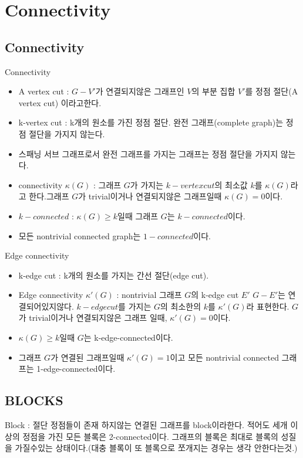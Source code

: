 \section{Connectivity}

\subsection{Connectivity}

\begin{dfn}[Connectivity] 
    Connectivity
    \begin{itemize}
        \item A vertex cut : $G-V'$가 연결되지않은 그래프인 $V$의 부분 집합 $V'$를 정점 절단(A vertex cut) 이라고한다.
        \item k-vertex cut : k개의 원소를 가진 정점 절단. 완전 그래프(complete graph)는 정점 절단을 가지지 않는다.
        \item 스패닝 서브 그래프로서 완전 그래프를 가지는 그래프는 정점 절단을 가지지 않는다.
        \item  connectivity $\kappa(G)$ : 그래프 $G$가 가지는 $k-vertex cut$의 최소값 $k$를 $\kappa(G)$라고 한다.그래프 $G$가 trivial이거나 연결되지않은 그래프일때 $\kappa(G) = 0$이다.
        \item $k-connected$ :  $\kappa(G) \ge k$일때 그래프 $G$는 $k-connected$이다. 
        \item 모든 nontrivial connected graph는 $1-connected$이다.
    \end{itemize}
\end{dfn}

\begin{dfn}
    Edge connectivity 
    \begin{itemize}
        \item k-edge cut : k개의 원소를 가지는 간선 절단(edge cut).
        \item Edge connectivity $\kappa'(G)$ : nontrivial 그래프 $G$의 k-edge cut $E'$ $G-E'$는 연결되어있지않다. $k-edge cut$를 가지는 $G$의 최소한의 $k$를 $\kappa'(G)$라 표현한다. $G$가 trivial이거나 연결되지않은 그래프 일때, $\kappa'(G) = 0$이다.
        \item $\kappa(G) \ge k$일때 $G$는 k-edge-connected이다.
        \item 그래프 $G$가 연결된 그래프일때  $\kappa'(G)= 1$이고 모든 nontrivial connected 그래프는 1-edge-connected이다.
    \end{itemize}
\end{dfn}


\subsection{BLOCKS}

\begin{dfn}[Blocks]
    Block : 절단 정점들이 존재 하지않는 연결된 그래프를 block이라한다.
    적어도 세개 이상의 정점을 가진 모든 블록은 2-connected이다.
    그래프의 블록은 최대로 블록의 성질을 가질수있는 상태이다.(대충 블록이 또 블록으로 쪼개지는 경우는 생각 안한다는것.)
\end{dfn}

\begin{theorem}
    
\end{theorem}